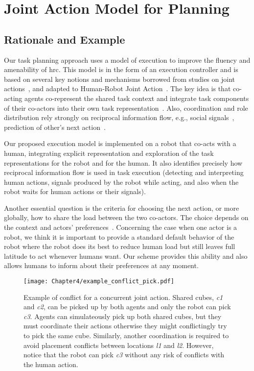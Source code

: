 \section{Joint Action Model for Planning}

    \subsection{Rationale and Example}



Our task planning approach uses a model of execution to improve the fluency and amenability of \acrshort{hrc}. 
This model is in the form of an execution controller and is based on several key notions and mechanisms borrowed from studies on joint actions~\cite{Sebanz_2016,kourtis2014attention}, and adapted to Human-Robot Joint Action~\cite{clodic-2017,curioni-2019}.
The key idea is that co-acting agents co-represent the shared task context and integrate task components of their co-actors into their own task representation~\cite{Schmitz-2017, Yamaguchi-19}. Also, coordination and role distribution rely strongly on reciprocal information flow, e.g., social signals~\cite{curioni-2019}, prediction of other's next action~\cite{luke-2018}.

Our proposed execution model is implemented on a robot that co-acts with a human, integrating explicit representation and exploration of the task representations for the robot and for the human. 
It also identifies precisely how reciprocal information flow is used in task execution (detecting and interpreting human actions, signals produced by the robot while acting, and also when the robot waits for human actions or their signals).

Another essential question is the criteria for choosing the next action, or more globally, how to share the load between the two co-actors. The choice depends on the context and actors' preferences~\cite{Gombolay-2015, Strachan-2020, Curioni-2022}. 
Concerning the case when one actor is a robot, we think it is important to provide a standard default behavior of the robot where the robot does its best to reduce human load but still leaves full latitude to act whenever humans want. 
Our scheme provides this ability and also allows humans to inform about their preferences at any moment.

\begin{figure}
    \center
    \texttt{[image: Chapter4/example\_conflict\_pick.pdf]}
    \caption{Example of conflict for a concurrent joint action. 
    Shared cubes, \emph{c1} and \emph{c2}, can be picked up by both agents and only the robot can pick \emph{c3}. 
    Agents can simulateously pick up both shared cubes, but they must coordinate their actions otherwise they might conflictingly try to pick the same cube. 
    Similarly, another coordination is required to avoid placement conflicts between locations \emph{l1} and \emph{l2}.
    However, notice that the robot can pick \emph{c3} without any risk of conflicts with the human action.}
    \label{fig:conflict_pick}
\end{figure}

